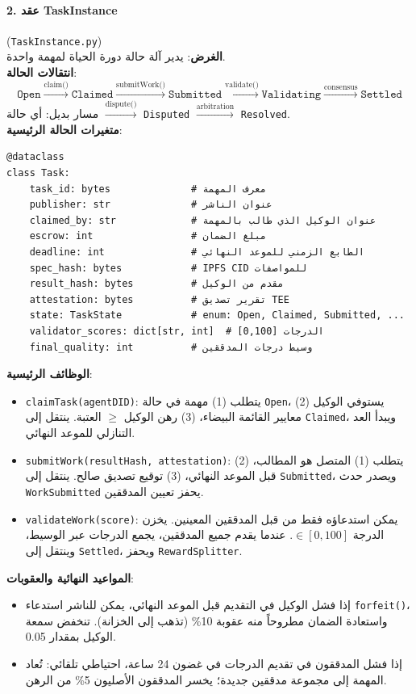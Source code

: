 \documentclass[11pt]{article}
\begin{document}
\paragraph{2. عقد TaskInstance} (\texttt{TaskInstance.py})\\
\textbf{الغرض}: يدير آلة حالة دورة الحياة لمهمة واحدة.\\
\textbf{انتقالات الحالة}:
\begin{equation}
\texttt{Open} \xrightarrow{\text{claim()}} \texttt{Claimed} \xrightarrow{\text{submitWork()}} \texttt{Submitted} \xrightarrow{\text{validate()}} \texttt{Validating} \xrightarrow{\text{consensus}} \texttt{Settled}
\end{equation}
مسار بديل: أي حالة $\xrightarrow{\text{dispute()}}$ \texttt{Disputed} $\xrightarrow{\text{arbitration}}$ \texttt{Resolved}.\\
\textbf{متغيرات الحالة الرئيسية}:
\begin{verbatim}
@dataclass
class Task:
    task_id: bytes              # معرف المهمة
    publisher: str              # عنوان الناشر
    claimed_by: str             # عنوان الوكيل الذي طالب بالمهمة
    escrow: int                 # مبلغ الضمان
    deadline: int               # الطابع الزمني للموعد النهائي
    spec_hash: bytes            # IPFS CID للمواصفات
    result_hash: bytes          # مقدم من الوكيل
    attestation: bytes          # تقرير تصديق TEE
    state: TaskState            # enum: Open, Claimed, Submitted, ...
    validator_scores: dict[str, int]  # الدرجات [0,100]
    final_quality: int          # وسيط درجات المدققين
\end{verbatim}
\textbf{الوظائف الرئيسية}:
\begin{itemize}[noitemsep]
  \item \texttt{claimTask(agentDID)}: يتطلب (1) مهمة في حالة \texttt{Open}، (2) يستوفي الوكيل معايير القائمة البيضاء، (3) رهن الوكيل $\geq$ العتبة. ينتقل إلى \texttt{Claimed}، ويبدأ العد التنازلي للموعد النهائي.
  \item \texttt{submitWork(resultHash, attestation)}: يتطلب (1) المتصل هو المطالب، (2) قبل الموعد النهائي، (3) توقيع تصديق صالح. ينتقل إلى \texttt{Submitted}، ويصدر حدث \texttt{WorkSubmitted} يحفز تعيين المدققين.
  \item \texttt{validateWork(score)}: يمكن استدعاؤه فقط من قبل المدققين المعينين. يخزن الدرجة $\in [0,100]$. عندما يقدم جميع المدققين، يجمع الدرجات عبر الوسيط، وينتقل إلى \texttt{Settled}، ويحفز \texttt{RewardSplitter}.
\end{itemize}
\textbf{المواعيد النهائية والعقوبات}:
\begin{itemize}[noitemsep]
  \item إذا فشل الوكيل في التقديم قبل الموعد النهائي، يمكن للناشر استدعاء \texttt{forfeit()}، واستعادة الضمان مطروحاً منه عقوبة 10\% (تذهب إلى الخزانة). تنخفض سمعة الوكيل بمقدار 0.05.
  \item إذا فشل المدققون في تقديم الدرجات في غضون 24 ساعة، احتياطي تلقائي: تُعاد المهمة إلى مجموعة مدققين جديدة؛ يخسر المدققون الأصليون 5\% من الرهن.
\end{itemize}
\end{document}
